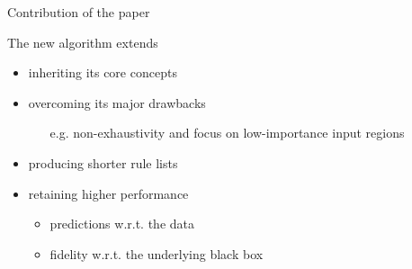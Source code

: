 \documentclass[presentation]{beamer}
\begin{document}

\begin{frame}{Contribution of the paper}

\begin{block}{The new \gridex algorithm extends \iter}
    \begin{itemize}
    	\item inheriting its core concepts
    	\item overcoming its major drawbacks
    	\begin{itemize}
    		\item[e.g.] non-exhaustivity and focus on low-importance input regions
    	\end{itemize}
        \item producing shorter rule lists
        \item retaining higher performance
    	\begin{itemize}
			\item predictions w.r.t. the data
			\item fidelity w.r.t. the underlying black box			
		\end{itemize}        
    \end{itemize}
\end{block}

\end{frame}
\end{document}
